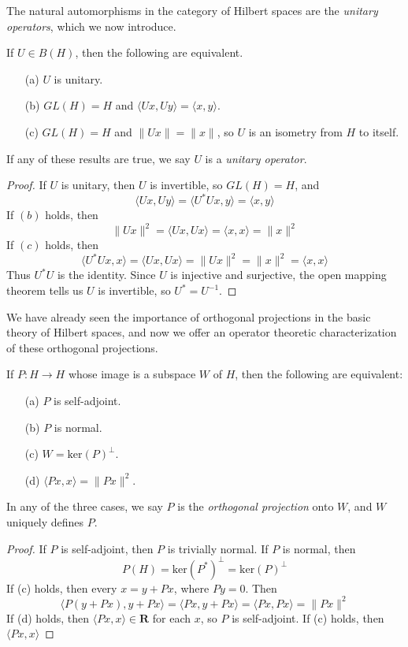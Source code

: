 The natural automorphisms in the category of Hilbert spaces are the \emph{unitary operators}, which we now introduce.

\begin{theorem}
    If $U \in B(H)$, then the following are equivalent.
    \begin{enumerate}
        \item[(a)] $U$ is unitary.
        \item[(b)] $GL(H) = H$ and $\langle Ux, Uy \rangle = \langle x, y \rangle$.
        \item[(c)] $GL(H) = H$ and $\| Ux \| = \| x \|$, so $U$ is an isometry from $H$ to itself.
    \end{enumerate}
    If any of these results are true, we say $U$ is a \emph{unitary operator}.
\end{theorem}
\begin{proof}
    If $U$ is unitary, then $U$ is invertible, so $GL(H) = H$, and
    \[ \langle Ux, Uy \rangle = \langle U^*Ux, y \rangle = \langle x, y \rangle \]
    If $(b)$ holds, then
    \[ \| Ux \|^2 = \langle Ux, Ux \rangle = \langle x, x \rangle = \| x \|^2 \]
    If $(c)$ holds, then
    \[ \langle U^*Ux, x \rangle = \langle Ux, Ux \rangle = \|Ux\|^2 = \|x\|^2 = \langle x, x \rangle \]
    Thus $U^*U$ is the identity. Since $U$ is injective and surjective, the open mapping theorem tells us $U$ is invertible, so $U^* = U^{-1}$.
\end{proof}

We have already seen the importance of orthogonal projections in the basic theory of Hilbert spaces, and now we offer an operator theoretic characterization of these orthogonal projections.

\begin{theorem}
    If $P: H \to H$ whose image is a subspace $W$ of $H$, then the following are equivalent:
    \begin{enumerate}
        \item[(a)] $P$ is self-adjoint.
        \item[(b)] $P$ is normal.
        \item[(c)] $W = \text{ker}(P)^\perp$.
        \item[(d)] $\langle Px, x \rangle = \| Px \|^2$.
    \end{enumerate}
    In any of the three cases, we say $P$ is the \emph{orthogonal projection} onto $W$, and $W$ uniquely defines $P$.
\end{theorem}
\begin{proof}
    If $P$ is self-adjoint, then $P$ is trivially normal. If $P$ is normal, then
    \[ P(H) = \text{ker}(P^*)^\perp = \text{ker}(P)^\perp \]
    If (c) holds, then every $x = y + Px$, where $Py = 0$. Then
    \[ \langle P(y + Px), y + Px \rangle = \langle Px, y + Px \rangle = \langle Px, Px \rangle = \| Px \|^2 \]
    If (d) holds, then $\langle Px, x \rangle \in \mathbf{R}$ for each $x$, so $P$ is self-adjoint. If (c) holds, then $\langle Px, x \rangle$
\end{proof}

